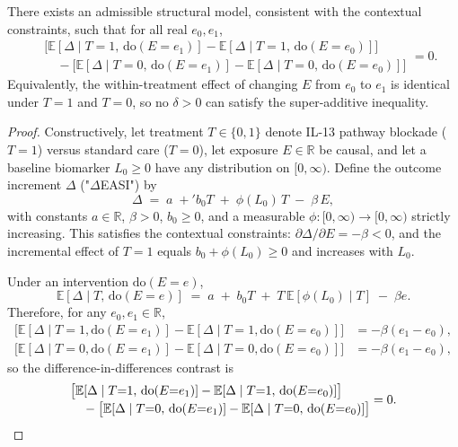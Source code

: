 ﻿\begin{proposition}\label{prop:non-superadditivity-il13}
There exists an admissible structural model, consistent with the contextual constraints, such that for all real $e_0,e_1$,
\[
\begin{aligned}
&\bigl[\mathbb{E}[\Delta\mid T{=}1,\,\mathrm{do}(E{=}e_1)]-\mathbb{E}[\Delta\mid T{=}1,\,\mathrm{do}(E{=}e_0)]\bigr]\\[-2pt]
&\quad-\bigl[\mathbb{E}[\Delta\mid T{=}0,\,\mathrm{do}(E{=}e_1)]-\mathbb{E}[\Delta\mid T{=}0,\,\mathrm{do}(E{=}e_0)]\bigr]
\end{aligned}
=0.
\]
Equivalently, the within-treatment effect of changing $E$ from $e_0$ to $e_1$ is identical under $T{=}1$ and $T{=}0$, so no $\delta>0$ can satisfy the super-additive inequality.
\end{proposition}

\begin{proof}
Constructively, let treatment $T\in\{0,1\}$ denote IL-13 pathway blockade ($T{=}1$) versus standard care ($T{=}0$), let exposure $E\in\mathbb{R}$ be causal, and let a baseline biomarker $L_0\ge 0$ have any distribution on $[0,\infty)$. Define the outcome increment $\Delta$ ("$\Delta$EASI") by
\[
\Delta\;=\;a\;+'b_0 T\;+\;\phi(L_0)\,T\;-\;\beta\,E,
\]
with constants $a\in\mathbb{R}$, $\beta>0$, $b_0\ge 0$, and a measurable $\phi:[0,\infty)\to[0,\infty)$ strictly increasing. This satisfies the contextual constraints: $\partial\Delta/\partial E=-\beta<0$, and the incremental effect of $T{=}1$ equals $b_0+\phi(L_0)\ge 0$ and increases with $L_0$.

Under an intervention $\mathrm{do}(E{=}e)$,
\[
\mathbb{E}[\Delta\mid T,\,\mathrm{do}(E{=}e)]\;=\;a\;+\;b_0T\;+\;T\,\mathbb{E}[\phi(L_0)\mid T]\;-\;\beta e.
\]
Therefore, for any $e_0,e_1\in\mathbb{R}$,
\[
\begin{aligned}
\bigl[\mathbb{E}[\Delta\mid T{=}1,\mathrm{do}(E{=}e_1)]-\mathbb{E}[\Delta\mid T{=}1,\mathrm{do}(E{=}e_0)]\bigr]&= -\beta(e_1-e_0),\\
\bigl[\mathbb{E}[\Delta\mid T{=}0,\mathrm{do}(E{=}e_1)]-\mathbb{E}[\Delta\mid T{=}0,\mathrm{do}(E{=}e_0)]\bigr]&= -\beta(e_1-e_0),
\end{aligned}
\]
so the difference-in-differences contrast is
\[
\begin{aligned}
&\bigl[\mathbb{E}[\Delta\mid T{=}1,\,\mathrm{do}(E{=}e_1)]-\mathbb{E}[\Delta\mid T{=}1,\,\mathrm{do}(E{=}e_0)]\bigr]\\[-2pt]
&\quad-\bigl[\mathbb{E}[\Delta\mid T{=}0,\,\mathrm{do}(E{=}e_1)]-\mathbb{E}[\Delta\mid T{=}0,\,\mathrm{do}(E{=}e_0)]\bigr]
\end{aligned}
=0.\qedhere
\]
\end{proof}
